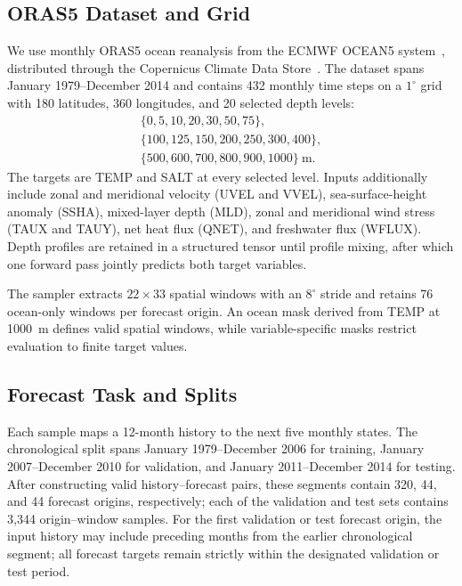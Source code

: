 \documentclass[conference]{IEEEtran}
\begin{document}
\subsection{ORAS5 Dataset and Grid}
We use monthly ORAS5 ocean reanalysis from the ECMWF OCEAN5 system~\cite{zuo2019ocean5}, distributed through the Copernicus Climate Data Store~\cite{copernicus2021oras5}. The dataset spans January 1979--December 2014 and contains 432 monthly time steps on a $1^\circ$ grid with 180 latitudes, 360 longitudes, and 20 selected depth levels:
\[
\begin{gathered}
\{0,5,10,20,30,50,75\},\\
\{100,125,150,200,250,300,400\},\\
\{500,600,700,800,900,1000\}\ \mathrm{m}.
\end{gathered}
\]
The targets are TEMP and SALT at every selected level. Inputs additionally include zonal and meridional velocity (UVEL and VVEL), sea-surface-height anomaly (SSHA), mixed-layer depth (MLD), zonal and meridional wind stress (TAUX and TAUY), net heat flux (QNET), and freshwater flux (WFLUX). Depth profiles are retained in a structured tensor until profile mixing, after which one forward pass jointly predicts both target variables.

The sampler extracts $22\times33$ spatial windows with an $8^\circ$ stride and retains 76 ocean-only windows per forecast origin. An ocean mask derived from TEMP at 1000~m defines valid spatial windows, while variable-specific masks restrict evaluation to finite target values.

\subsection{Forecast Task and Splits}
Each sample maps a 12-month history to the next five monthly states. The chronological split spans January 1979--December 2006 for training, January 2007--December 2010 for validation, and January 2011--December 2014 for testing. After constructing valid history--forecast pairs, these segments contain 320, 44, and 44 forecast origins, respectively; each of the validation and test sets contains 3,344 origin--window samples. For the first validation or test forecast origin, the input history may include preceding months from the earlier chronological segment; all forecast targets remain strictly within the designated validation or test period.
\end{document}
